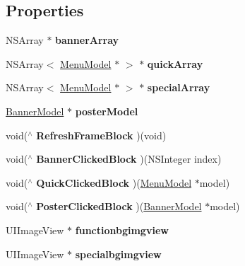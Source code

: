 \subsection*{Properties}
\begin{DoxyCompactItemize}
\item 
\mbox{\label{interface_f_n_home_header_view_a0a4f8ab5280872ff7c6c95f915127f9f}} 
N\+S\+Array $\ast$ {\bfseries banner\+Array}
\item 
\mbox{\label{interface_f_n_home_header_view_afb8b1ee14a4eae7f2e9fb4ffd422bdaf}} 
N\+S\+Array$<$ \mbox{\hyperlink{interface_menu_model}{Menu\+Model}} $\ast$ $>$ $\ast$ {\bfseries quick\+Array}
\item 
\mbox{\label{interface_f_n_home_header_view_a91125c57600c8a21b194552b17ef26ee}} 
N\+S\+Array$<$ \mbox{\hyperlink{interface_menu_model}{Menu\+Model}} $\ast$ $>$ $\ast$ {\bfseries special\+Array}
\item 
\mbox{\label{interface_f_n_home_header_view_a73c6c02d1b2df1f2dea2d3d9d6c5a0b3}} 
\mbox{\hyperlink{interface_banner_model}{Banner\+Model}} $\ast$ {\bfseries poster\+Model}
\item 
\mbox{\label{interface_f_n_home_header_view_abc33566266f65f3b5ed7507b175b9681}} 
void($^\wedge$ {\bfseries Refresh\+Frame\+Block} )(void)
\item 
\mbox{\label{interface_f_n_home_header_view_a489031c0a900a93e8c4daf8af61709c8}} 
void($^\wedge$ {\bfseries Banner\+Clicked\+Block} )(N\+S\+Integer index)
\item 
\mbox{\label{interface_f_n_home_header_view_a0bda2587ed9c0fc3c848de8437842a52}} 
void($^\wedge$ {\bfseries Quick\+Clicked\+Block} )(\mbox{\hyperlink{interface_menu_model}{Menu\+Model}} $\ast$model)
\item 
\mbox{\label{interface_f_n_home_header_view_a41aba978d32779457dc627e1b638e164}} 
void($^\wedge$ {\bfseries Poster\+Clicked\+Block} )(\mbox{\hyperlink{interface_banner_model}{Banner\+Model}} $\ast$model)
\item 
\mbox{\label{interface_f_n_home_header_view_aeb8795bffa9ba9ca14572f846126806d}} 
U\+I\+Image\+View $\ast$ {\bfseries functionbgimgview}
\item 
\mbox{\label{interface_f_n_home_header_view_a52665112109966a1d96b36bb5cd37d1d}} 
U\+I\+Image\+View $\ast$ {\bfseries specialbgimgview}
\end{DoxyCompactItemize}


